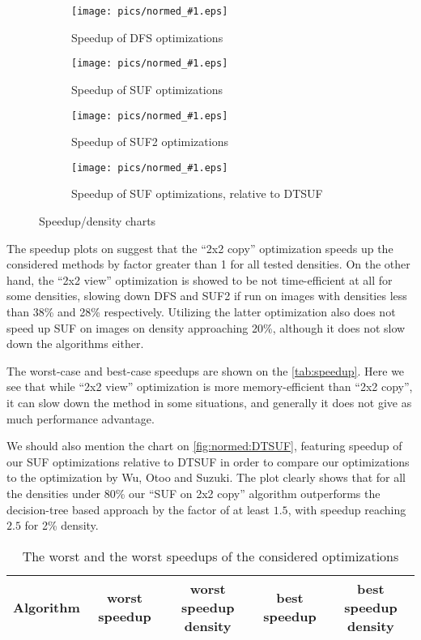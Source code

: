 \documentclass[hidelinks]{llncs}
\begin{document}
\newcommand{\inputnorm}[2]{
  \begin{subfigure}[t]{0.45\linewidth}
    \centering
    \texttt{[image: pics/normed\_\#1.eps]}
    \caption{Speedup of #2}
    \label{fig:normed:#1}
  \end{subfigure}
}

\begin{figure}
  \centering
  \inputnorm{DFS}{DFS optimizations}
  \inputnorm{SUF}{SUF optimizations}
  \inputnorm{SUF2}{SUF2 optimizations}
  \inputnorm{DTSUF}{SUF optimizations, relative to DTSUF}
  \caption{Speedup/density charts}
  \label{fig:normed}
\end{figure}

The speedup plots on 
suggest that the ``2x2 copy'' optimization speeds up the considered methods by
factor greater than 1 for all tested densities. On the other hand, the
``2x2 view'' optimization is showed to be not time-efficient at all for some
densities, slowing down DFS and SUF2 if run on images with densities less than
38\% and 28\% respectively. Utilizing the latter optimization also does not
speed up SUF on images on density approaching 20\%, although it does not slow
down the algorithms either.

The worst-case and best-case speedups are shown on the \autoref{tab:speedup}.
Here we see that while ``2x2 view'' optimization is more memory-efficient than
``2x2 copy'', it can slow down the method in some situations, and generally it
does not give as much performance advantage.

We should also mention the chart on \autoref{fig:normed:DTSUF}, featuring
speedup of our SUF optimizations relative to DTSUF in order to compare our
optimizations to the optimization by Wu, Otoo and Suzuki. The plot clearly shows
that for all the densities under 80\% our ``SUF on 2x2 copy'' algorithm
outperforms the decision-tree based approach by the factor of at least
$1.5$, with speedup reaching $2.5$ for 2\% density.

\begin{table}
  \centering
  \begin{tabular}{l|c|c|c|c}
    Algorithm & worst speedup & worst speedup density & best speedup & best
    speedup density \\
    \hline
    
  \end{tabular}
  \caption{The worst and the worst speedups of the considered optimizations}
  \label{tab:speedup}
\end{table}
\end{document}
